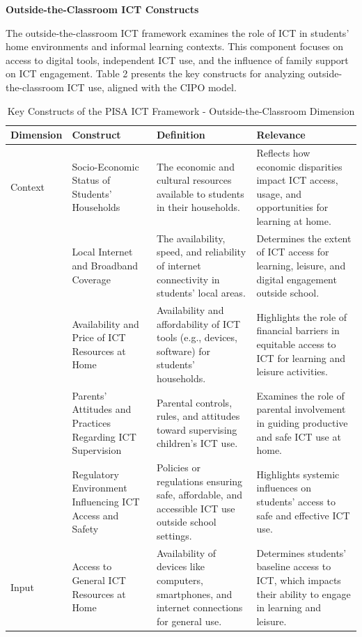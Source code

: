 \documentclass[
]{article}
\begin{document}
\textbf{Outside-the-Classroom ICT Constructs}

The outside-the-classroom ICT framework examines the role of ICT in
students' home environments and informal learning contexts. This
component focuses on access to digital tools, independent ICT use, and
the influence of family support on ICT engagement. Table 2 presents the
key constructs for analyzing outside-the-classroom ICT use, aligned with
the CIPO model.

\begin{longtable}[t]{>{\raggedright\arraybackslash}p{1.5cm}>{\raggedright\arraybackslash}p{3.5cm}>{\raggedright\arraybackslash}p{5cm}>{\raggedright\arraybackslash}p{5cm}}
\caption{\label{tab:out_of_school_constructs}Key Constructs of the PISA ICT Framework - Outside-the-Classroom Dimension}\\
\toprule
Dimension & Construct & Definition & Relevance\\
\midrule
Context & Socio-Economic Status of Students' Households & The economic and cultural resources available to students in their households. & Reflects how economic disparities impact ICT access, usage, and opportunities for learning at home.\\
 & Local Internet and Broadband Coverage & The availability, speed, and reliability of internet connectivity in students' local areas. & Determines the extent of ICT access for learning, leisure, and digital engagement outside school.\\
 & Availability and Price of ICT Resources at Home & Availability and affordability of ICT tools (e.g., devices, software) for students' households. & Highlights the role of financial barriers in equitable access to ICT for learning and leisure activities.\\
 & Parents' Attitudes and Practices Regarding ICT Supervision & Parental controls, rules, and attitudes toward supervising children's ICT use. & Examines the role of parental involvement in guiding productive and safe ICT use at home.\\
 & Regulatory Environment Influencing ICT Access and Safety & Policies or regulations ensuring safe, affordable, and accessible ICT use outside school settings. & Highlights systemic influences on students' access to safe and effective ICT use.\\
\addlinespace
Input & Access to General ICT Resources at Home & Availability of devices like computers, smartphones, and internet connections for general use. & Determines students' baseline access to ICT, which impacts their ability to engage in learning and leisure.\\

\end{longtable}
\end{document}
